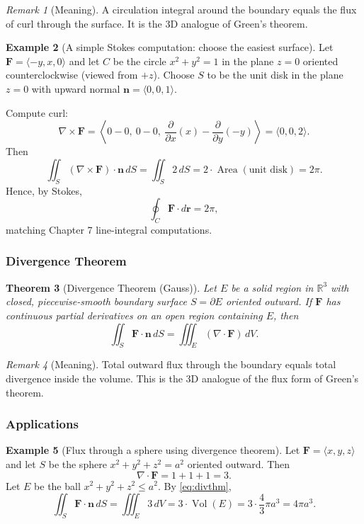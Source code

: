 \documentclass[12pt]{article}
\numberwithin{equation}{section}
\newcommand{\RR}{\mathbb{R}}
\newcommand{\vect}[1]{\boldsymbol{#1}}   %
\theoremstyle{plain}
\newtheorem{theorem}{Theorem}[section]
\theoremstyle{definition}
\newtheorem{example}[theorem]{Example}
\theoremstyle{remark}
\newtheorem{remark}[theorem]{Remark}
\begin{document}
\begin{remark}[Meaning]
A circulation integral around the boundary equals the flux of curl through the surface.  
It is the 3D analogue of Green's theorem.
\end{remark}

\begin{example}[A simple Stokes computation: choose the easiest surface]\label{ex:stokes-disk}
Let $\vect F=\langle -y,x,0\rangle$ and let $C$ be the circle $x^2+y^2=1$ in the plane $z=0$ oriented counterclockwise (viewed from $+z$).
Choose $S$ to be the unit disk in the plane $z=0$ with upward normal $\vect n=\langle 0,0,1\rangle$.

Compute curl:
\[
\nabla\times \vect F
=
\left\langle
0-0,\ 0-0,\ \frac{\partial}{\partial x}(x)-\frac{\partial}{\partial y}(-y)
\right\rangle
=
\langle 0,0,2\rangle.
\]
Then
\[
\iint_S (\nabla\times \vect F)\cdot \vect n\,dS
=
\iint_S 2\,dS
=2\cdot \operatorname{Area}(\text{unit disk})
=2\pi.
\]
Hence, by Stokes,
\[
\oint_C \vect F\cdot d\vect r =2\pi,
\]
matching Chapter 7 line-integral computations.
\end{example}

\subsubsection{Divergence Theorem}

\begin{theorem}[Divergence Theorem (Gauss)]\label{thm:divthm}
Let $E$ be a solid region in $\RR^3$ with closed, piecewise-smooth boundary surface $S=\partial E$ oriented outward.
If $\vect F$ has continuous partial derivatives on an open region containing $E$, then
\begin{equation}\label{eq:divthm}
\iint_{S} \vect F\cdot \vect n\,dS
=
\iiint_{E} (\nabla\cdot \vect F)\,dV.
\end{equation}
\end{theorem}

\begin{remark}[Meaning]
Total outward flux through the boundary equals total divergence inside the volume.  
This is the 3D analogue of the flux form of Green's theorem.
\end{remark}

\subsubsection{Applications}

\begin{example}[Flux through a sphere using divergence theorem]\label{ex:flux-sphere}
Let $\vect F=\langle x,y,z\rangle$ and let $S$ be the sphere $x^2+y^2+z^2=a^2$ oriented outward.
Then
\[
\nabla\cdot \vect F = 1+1+1=3.
\]
Let $E$ be the ball $x^2+y^2+z^2\le a^2$. By \cref{eq:divthm},
\[
\iint_S \vect F\cdot \vect n\,dS=\iiint_E 3\,dV=3\cdot \operatorname{Vol}(E)=3\cdot \frac{4}{3}\pi a^3=4\pi a^3.
\]
\end{example}
\end{document}

